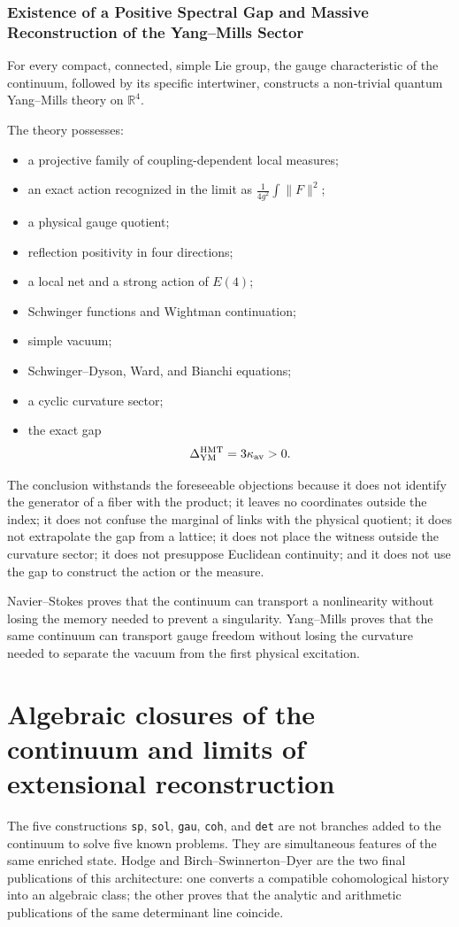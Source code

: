 \subsubsection{Existence of a Positive Spectral Gap and Massive Reconstruction of the Yang–Mills Sector}
For every compact, connected, simple Lie group, the gauge characteristic of the continuum, followed by its specific intertwiner, constructs a non-trivial quantum Yang--Mills theory on \(\mathbb R^4\).\par
The theory possesses:\par
\begin{itemize}
\item a projective family of coupling-dependent local measures;
\item an exact action recognized in the limit as \(\frac1{4g^2}\int\|F\|^2\);
\item a physical gauge quotient;
\item reflection positivity in four directions;
\item a local net and a strong action of \(E(4)\);
\item Schwinger functions and Wightman continuation;
\item simple vacuum;
\item Schwinger–Dyson, Ward, and Bianchi equations;
\item a cyclic curvature sector;
\item the exact gap
  \[
  \Delta_{\rm YM}^{\rm HMT}=3\kappa_{\rm av}>0.
  \]
\end{itemize}
The conclusion withstands the foreseeable objections because it does not identify the generator of a fiber with the product; it leaves no coordinates outside the index; it does not confuse the marginal of links with the physical quotient; it does not extrapolate the gap from a lattice; it does not place the witness outside the curvature sector; it does not presuppose Euclidean continuity; and it does not use the gap to construct the action or the measure.\par
Navier–Stokes proves that the continuum can transport a nonlinearity without losing the memory needed to prevent a singularity. Yang–Mills proves that the same continuum can transport gauge freedom without losing the curvature needed to separate the vacuum from the first physical excitation.\par

\section{Algebraic closures of the continuum and limits of extensional reconstruction}
The five constructions \texttt{sp}, \texttt{sol}, \texttt{gau}, \texttt{coh}, and \texttt{det} are not branches added to the continuum to solve five known problems. They are simultaneous features of the same enriched state. Hodge and Birch–Swinnerton–Dyer are the two final publications of this architecture: one converts a compatible cohomological history into an algebraic class; the other proves that the analytic and arithmetic publications of the same determinant line coincide.\par
{}
